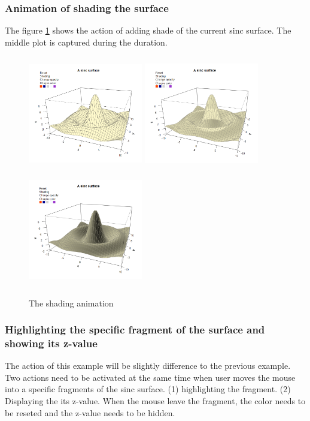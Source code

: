 \documentclass[paper=a4, fontsize=11pt]{report}
\begin{document}
\subsubsection*{Animation of shading the surface}
The figure \ref{Example_6.3.3} shows the action of adding shade of the current sinc surface. The middle plot is captured during the duration.
\begin{figure}[h]
	\begin{center}
		\includegraphics[height = 5cm, width = 5cm]{figure/svg/origin_1.PNG}
		\includegraphics[height = 5cm, width = 5cm]{figure/svg/Shade_2.PNG}
		\includegraphics[height = 5cm, width = 5cm]{figure/svg/Shade_3.PNG}
		\caption{The shading animation}
		\label{Example_6.3.3}
	\end{center}
\end{figure}

\subsubsection*{Highlighting the specific fragment of the surface and showing its z-value}
The action of this example will be slightly difference to the previous example. Two actions need to be activated at the same time when user moves the mouse into a specific fragments of the sinc surface. (1) highlighting the fragment. (2) Displaying the its z-value. When the mouse leave the fragment, the color needs to be reseted and the z-value needs to be hidden.\\
\end{document}
